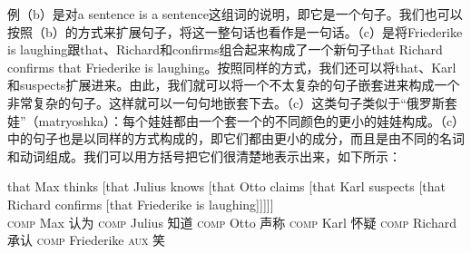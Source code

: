 例（b）是对a sentence is a sentence这组词的说明，即它是一个句子。我们也可以按照（b）的方式来扩展句子，将这一整句话也看作是一句话。（c）是将Friederike is laughing跟that、Richard和confirms组合起来构成了一个新句子that Richard confirms that Friederike is laughing。按照同样的方式，我们还可以将that、Karl和suspects扩展进来。由此，我们就可以将一个不太复杂的句子嵌套进来构成一个非常复杂的句子。这样就可以一句句地嵌套下去。（c）这类句子类似于“俄罗斯套娃”（matryoshka）：每个娃娃都由一个套一个的不同颜色的更小的娃娃构成。（c）中的句子也是以同样的方式构成的，即它们都由更小的成分，而且是由不同的名词和动词组成。我们可以用方括号把它们很清楚地表示出来，如下所示：

\ea
\label{ex-that-max-thinks-that-recursion}
\gll that          Max thinks [that                 Julius knows [that Otto claims [that Karl suspects [that Richard confirms [that Friederike is laughing]]]]]\\
     \textsc{comp} Max 认为    \spacebr\textsc{comp} Julius 知道  \spacebr\textsc{comp} Otto 声称 \spacebr\textsc{comp} Karl 怀疑 \spacebr\textsc{comp} Richard 承认 \spacebr\textsc{comp} Friederike \textsc{aux} 笑\\
\z

